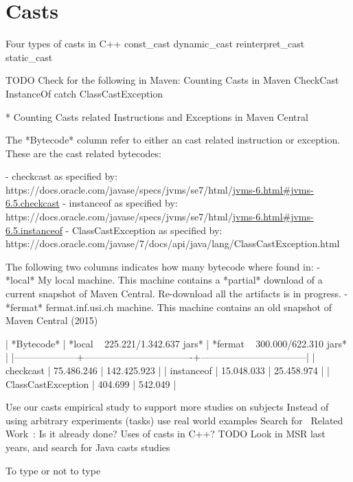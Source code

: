 
\chapter{Casts} \label{cha:casts}


Four types of casts in C++
const\_cast
dynamic\_cast
reinterpret\_cast
static\_cast



TODO Check for the following in Maven:
Counting Casts in Maven
CheckCast
InstanceOf
catch ClassCastException



* Counting Casts related Instructions and Exceptions in Maven Central

The *Bytecode* column refer to either an cast related instruction or exception.
These are the cast related bytecodes:

- checkcast as specified by:
https://docs.oracle.com/javase/specs/jvms/se7/html/\url{jvms-6.html#jvms-6.5.checkcast}
- instanceof as specified by:
https://docs.oracle.com/javase/specs/jvms/se7/html/\url{jvms-6.html#jvms-6.5.instanceof}
- ClassCastException as specified by:
https://docs.oracle.com/javase/7/docs/api/java/lang/ClassCastException.html

The following two columns indicates how many bytecode where found in:
- *local*
My local machine.
This machine contains a *partial* download of a current snapshot of Maven Central.
Re-download all the artifacts is in progress.
- *fermat*
fermat.inf.usi.ch machine.
This machine contains an old snapshot of Maven Central (2015)

| *Bytecode*         | *local ~ 225.221/1.342.637 jars* | *fermat ~ 300.000/622.310 jars* |
|--------------------+----------------------------------+---------------------------------|
| checkcast          |                       75.486.246 |                     142.425.923 |
| instanceof         |                       15.048.033 |                      25.458.974 |
| ClassCastException |                          404.699 |                         542.049 |





Use our casts empirical study to support more studies on subjects
Instead of using arbitrary experiments (tasks) use real world examples
Search for ~Related Work~: Is it already done?
Uses of casts in C++?
TODO Look in MSR last years, and search for Java casts studies




To type or not to type

